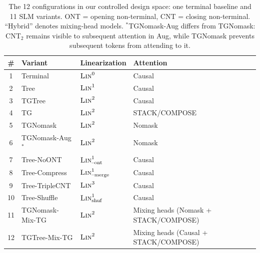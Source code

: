 \documentclass[11pt]{article}
\begin{document}

\begin{table}[t]
  \centering
  \setlength{\tabcolsep}{6pt}
  \begin{tabular}{cllll}
    \toprule
    \# & Variant & Linearization & Attention  \\
    \midrule
    1 & Terminal & $\textsc{Lin}^0$ & Causal  \\
    2 & Tree & $\textsc{Lin}^1$ & Causal \\
    3 & TGTree & $\textsc{Lin}^2$ & Causal  \\
    4 & TG & $\textsc{Lin}^2$ & STACK/COMPOSE  \\
    5 & TGNomask & $\textsc{Lin}^2$ & Nomask  \\
    6 & TGNomask-Aug$^*$ & $\textsc{Lin}^2$ & Nomask  \\
    7 & Tree-NoONT & $\textsc{Lin}^1_{\text{--ont}}$ & Causal \\
    8 & Tree-Compress & $\textsc{Lin}^1_{\text{--merge}}$ & Causal \\
    9 & Tree-TripleCNT & $\textsc{Lin}^3$ & Causal  \\
    10 & Tree-Shuffle & $\textsc{Lin}^1_{\text{shuf}}$ & Causal   \\
    11 & TGNomask-Mix-TG & $\textsc{Lin}^2$ & Mixing heads (Nomask + STACK/COMPOSE)  \\
    12 & TGTree-Mix-TG & $\textsc{Lin}^2$ & Mixing heads (Causal   + STACK/COMPOSE)  \\
    \bottomrule
  \end{tabular}
  \caption{The 12 configurations in our controlled design space: one terminal baseline and 11 SLM variants. ONT = opening non-terminal, CNT = closing non-terminal. ``Hybrid'' denotes mixing-head models. $^*$TGNomask-Aug differs from TGNomask: CNT$_2$ remains visible to subsequent attention in Aug, while TGNomask prevents subsequent tokens from attending to it.}
  \label{tab:variants}
\end{table}
\end{document}
